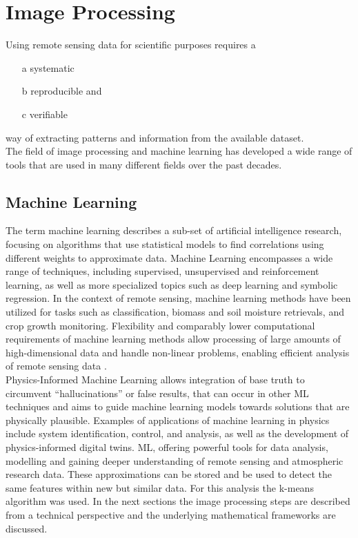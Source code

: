 \documentclass[12pt,a4paper, english,twoside]{scrartcl}
\begin{document}
\section{Image Processing}\label{sec:imgProcessing}
    Using remote sensing data for scientific purposes requires a 
    \begin{itemize} 
      \item[a] systematic
      \item[b] reproducible and 
      \item[c] verifiable 
    \end{itemize}%
    way of extracting patterns and information from the available dataset.\\
    The field of image processing and machine learning has developed a wide range of tools that are used in many different fields over the past decades. 
    \subsection{Machine Learning}\label{sec:ml}
      The term machine learning describes a sub-set of artificial intelligence research, focusing on algorithms that use statistical models to find correlations using different weights to approximate data.
      Machine Learning encompasses a wide range of techniques, including supervised, unsupervised and reinforcement learning, as well as more specialized topics such as deep learning and symbolic regression\autocite{Rodrigues2023}. 
      In the context of remote sensing, machine learning methods have been utilized for tasks such as classification, biomass and soil moisture retrievals, and crop growth monitoring.
      Flexibility and comparably lower computational requirements of machine learning methods allow processing of large amounts of high-dimensional data and handle non-linear problems, enabling efficient analysis of remote sensing data \autocite{Maxwell2018}.\\
      Physics-Informed Machine Learning allows integration of base truth to circumvent ``hallucinations'' or false results, that can occur in other \gls{ML} techniques and aims to guide machine learning models towards solutions that are physically plausible.
      Examples of applications of machine learning in physics include system identification, control, and analysis, as well as the development of physics-informed digital twins. 
      \gls{ML}, offering powerful tools for data analysis, modelling and gaining deeper understanding of remote sensing and atmospheric research data.
      These approximations can be stored and be used to detect the same features within new but similar data.
      For this analysis the k-means algorithm was used. 
      In the next sections the image processing steps are described from a technical perspective and the underlying mathematical frameworks are discussed.
\end{document}
